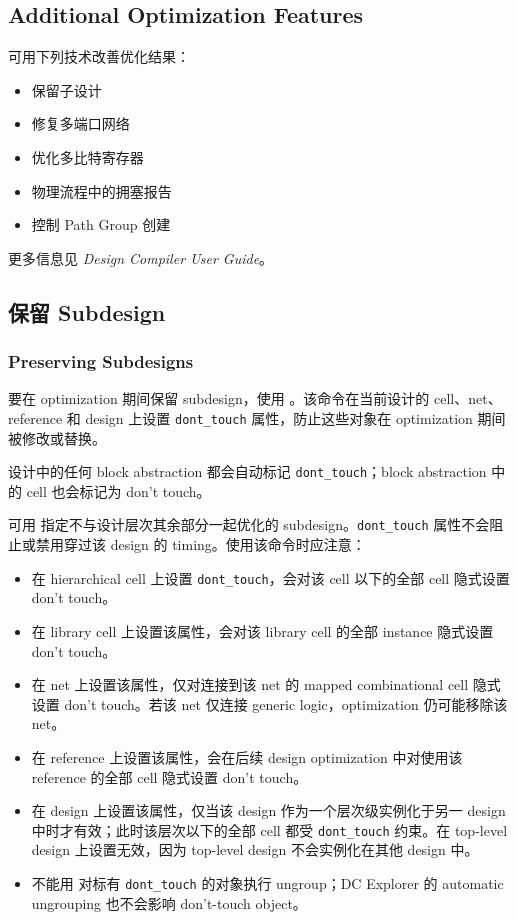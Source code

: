 \subsection*{Additional Optimization Features}

可用下列技术改善优化结果：
\begin{itemize}
  \item 保留子设计
  \item 修复多端口网络
  \item 优化多比特寄存器
  \item 物理流程中的拥塞报告
  \item 控制 Path Group 创建
\end{itemize}

更多信息见 \textit{Design Compiler User Guide}。

\subsection{保留 Subdesign}
\subsubsection*{Preserving Subdesigns}

要在 optimization 期间保留 subdesign，使用 。该命令在当前设计的 cell、net、reference 和 design 上设置 \texttt{dont\_touch} 属性，防止这些对象在 optimization 期间被修改或替换。

\begin{noteBox}
设计中的任何 block abstraction 都会自动标记 \texttt{dont\_touch}；block abstraction 中的 cell 也会标记为 don't touch。
\end{noteBox}

可用  指定不与设计层次其余部分一起优化的 subdesign。\texttt{dont\_touch} 属性不会阻止或禁用穿过该 design 的 timing。使用该命令时应注意：
\begin{itemize}
  \item 在 hierarchical cell 上设置 \texttt{dont\_touch}，会对该 cell 以下的全部 cell 隐式设置 don't touch。
  \item 在 library cell 上设置该属性，会对该 library cell 的全部 instance 隐式设置 don't touch。
  \item 在 net 上设置该属性，仅对连接到该 net 的 mapped combinational cell 隐式设置 don't touch。若该 net 仅连接 generic logic，optimization 仍可能移除该 net。
  \item 在 reference 上设置该属性，会在后续 design optimization 中对使用该 reference 的全部 cell 隐式设置 don't touch。
  \item 在 design 上设置该属性，仅当该 design 作为一个层次级实例化于另一 design 中时才有效；此时该层次以下的全部 cell 都受 \texttt{dont\_touch} 约束。在 top-level design 上设置无效，因为 top-level design 不会实例化在其他 design 中。
  \item 不能用  对标有 \texttt{dont\_touch} 的对象执行 ungroup；DC Explorer 的 automatic ungrouping 也不会影响 don't-touch object。
\end{itemize}

